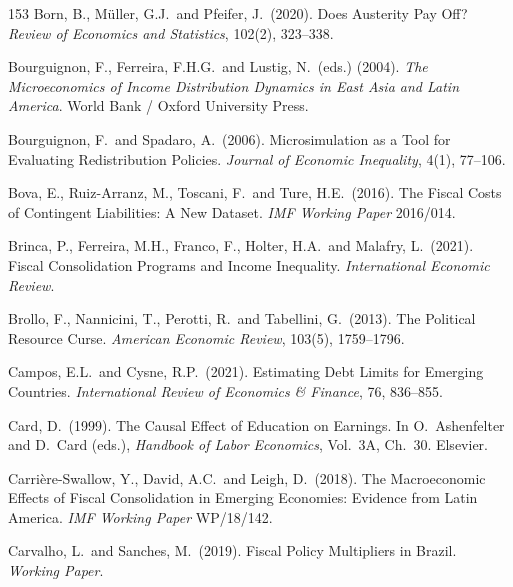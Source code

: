 \documentclass[11pt,a4paper]{article}
\begin{document}
\begin{thebibliography}{153}
 Born, B., M\"uller, G.J.\ and Pfeifer, J.\ (2020). Does Austerity Pay Off? \textit{Review of Economics and Statistics}, 102(2), 323--338.

 Bourguignon, F., Ferreira, F.H.G.\ and Lustig, N.\ (eds.) (2004). \textit{The Microeconomics of Income Distribution Dynamics in East Asia and Latin America}. World Bank / Oxford University Press.

 Bourguignon, F.\ and Spadaro, A.\ (2006). Microsimulation as a Tool for Evaluating Redistribution Policies. \textit{Journal of Economic Inequality}, 4(1), 77--106.

 Bova, E., Ruiz-Arranz, M., Toscani, F.\ and Ture, H.E.\ (2016). The Fiscal Costs of Contingent Liabilities: A New Dataset. \textit{IMF Working Paper} 2016/014.

 Brinca, P., Ferreira, M.H., Franco, F., Holter, H.A.\ and Malafry, L.\ (2021). Fiscal Consolidation Programs and Income Inequality. \textit{International Economic Review}.

 Brollo, F., Nannicini, T., Perotti, R.\ and Tabellini, G.\ (2013). The Political Resource Curse. \textit{American Economic Review}, 103(5), 1759--1796.

 Campos, E.L.\ and Cysne, R.P.\ (2021). Estimating Debt Limits for Emerging Countries. \textit{International Review of Economics \& Finance}, 76, 836--855.

 Card, D.\ (1999). The Causal Effect of Education on Earnings. In O.\ Ashenfelter and D.\ Card (eds.), \textit{Handbook of Labor Economics}, Vol.\ 3A, Ch.\ 30. Elsevier.

 Carri\`ere-Swallow, Y., David, A.C.\ and Leigh, D.\ (2018). The Macroeconomic Effects of Fiscal Consolidation in Emerging Economies: Evidence from Latin America. \textit{IMF Working Paper} WP/18/142.

 Carvalho, L.\ and Sanches, M.\ (2019). Fiscal Policy Multipliers in Brazil. \textit{Working Paper}.


\end{thebibliography}
\end{document}
